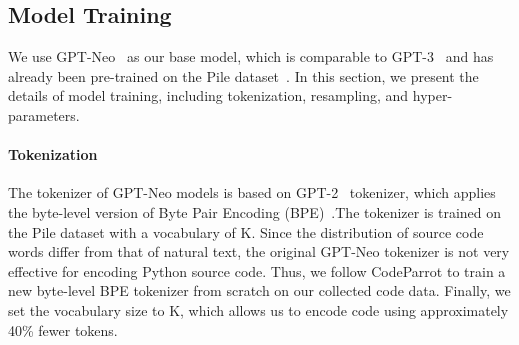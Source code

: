 \documentclass{article}
\begin{document}
\begin{table}[t]
	\centering
	\caption{Hyper-parameters in pre-training.}
	\label{Table:TrainingHyperParameters}
\end{table}

\subsection{Model Training}
We use GPT-Neo~\cite{gpt-neo} as our base model, which is comparable to GPT-3~\cite{brown2020language} and has already been pre-trained on the Pile dataset~\cite{gao2020pile}. 
In this section, we present the details of model training, including tokenization, resampling, and hyper-parameters.

\paragraph{Tokenization}
The tokenizer of GPT-Neo models is based on GPT-2~\cite{radford2019language} tokenizer, which applies the byte-level version of Byte Pair Encoding (BPE)~\cite{sennrich2016neural}.The tokenizer is trained on the Pile dataset with a vocabulary of K. 
Since the distribution of source code words differ from that of natural text, the original GPT-Neo tokenizer is not very effective for encoding Python source code. 
Thus, we follow CodeParrot to train a new byte-level BPE tokenizer from scratch on our collected code data. 
Finally, we set the vocabulary size to K, which allows us to encode code using approximately 40\% fewer tokens. 
\end{document}
